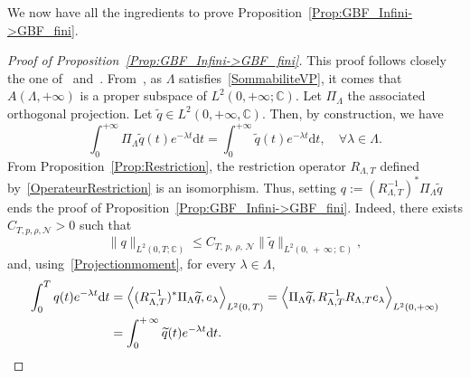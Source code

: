\documentclass[11pt]{article}
\theoremstyle{definition}
\numberwithin{equation}{section}
\numberwithin{figure}{section}
\numberwithin{table}{section}
\newcommand{\NN}{\mathcal{N}}
\newcommand{\C}{\mathbb{C}}
\newcommand{\lag}{\langle}
\newcommand{\rag}{\rangle}
\newcommand{\md}{\mathrm{d}}
\let\oldforall\forall
\renewcommand*{\forall}{\mathrel{\oldforall}}
\begin{document}
We now have all the ingredients to prove Proposition~\ref{Prop:GBF_Infini->GBF_fini}.




\begin{proof}[Proof of Proposition~\ref{Prop:GBF_Infini->GBF_fini}]
This proof follows closely the one of~\cite[Section~4]{AKBGBDT_Kalman} and~\cite[Lemma~4.2]{AmmarKhodjaBenabdallahGonzalez-BurgosdeTeresa:2014}. From~\cite[Corollary~4.3]{AKBGBDT_Kalman}, as $\Lambda$ satisfies~\eqref{SommabiliteVP}, it comes that $A(\Lambda, +\infty)$ is a proper subspace of $L^2(0, +\infty ; \C)$. Let $\Pi_\Lambda$ the associated orthogonal projection. Let $\widetilde{q} \in L^2(0,+\infty, \C)$. Then, by construction, we have
\begin{equation}\label{Projectionmoment}
\int_0^{+\infty} \Pi_\Lambda \widetilde{q}(t) e^{-\lambda t} \md t = \int_0^{+\infty} \widetilde{q}(t) e^{-\lambda t} \md t,
\quad \forall \lambda\in \Lambda.
\end{equation}
From Proposition~\ref{Prop:Restriction}, the restriction operator $R_{\Lambda,T}$ defined by~\eqref{OperateurRestriction} is an isomorphism. Thus, setting $q := (R_{\Lambda,T}^{-1})^* \Pi_\Lambda \widetilde{q}$ ends the proof of Proposition~\ref{Prop:GBF_Infini->GBF_fini}. Indeed, there exists $C_{T,p,\rho,\NN}>0$ such that
\[
\| q \|_{L^2(0,T ; \C)} \leq C_{T,\,p,\,\rho,\,\NN} \| \widetilde{q} \|_{L^2(0,\,+\,\infty\,;\, \C)},
\]
and, using~\eqref{Projectionmoment}, for every $\lambda\in \Lambda$,
\begin{align*}
\int_0^T q(t) e^{-\lambda t} \md t &= \left\lag (R_{\Lambda,T}^{-1})^* \Pi_\Lambda\widetilde{q}, e_\lambda \right\rag_{L^2(0,\,T)} = \left\lag \Pi_\Lambda\widetilde{q}, R_{\Lambda,T}^{-1} R_{\Lambda,T} e_\lambda \right\rag_{L^2(0,+\infty)}
\\
&= \int_0^{+\,\infty} \widetilde{q}(t) e^{-\lambda t} \md t.\qedhere
\end{align*}
\end{proof}
\end{document}
